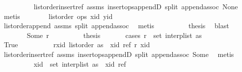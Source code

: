 \begin{isabellebody}
\ \ \ \ \ \ \ \ \isamarkupfalse%
\ list{\isacharunderscore}order{\isacharunderscore}insert{\isacharunderscore}ref\ assms{\isacharparenleft}{}{\isacharparenright}\ insert{\isacharunderscore}ops{\isacharunderscore}appendD\ split\ append{\isachardot}assoc\ None\ \isamarkupfalse%
\ metis\isanewline
\ \ \ \ \ \ \isamarkupfalse%
\ {\isachardoublequoteopen}list{\isacharunderscore}order\ ops\ xid\ yid{\isachardoublequoteclose}\isanewline
\ \ \ \ \ \ \ \ \isamarkupfalse%
\ list{\isacharunderscore}order{\isacharunderscore}append\ assms{\isacharparenleft}{}{\isacharparenright}\ split\ append{\isachardot}assoc\ \isamarkupfalse%
\ metis\isanewline
\ \ \ \ \ \ \isamarkupfalse%
\ \isamarkupfalse%
\ {\isacharquery}thesis\ \isamarkupfalse%
\ blast\isanewline
\ \ \ \ \isamarkupfalse%
\isanewline
\ \ \ \ \ \ \isamarkupfalse%
\ {\isacharparenleft}Some\ r{\isacharparenright}\isanewline
\ \ \ \ \ \ \isamarkupfalse%
\ \isamarkupfalse%
\ {\isacharquery}thesis\isanewline
\ \ \ \ \ \ \isamarkupfalse%
{\isacharparenleft}cases\ {\isachardoublequoteopen}r\ {\isasymin}\ set\ {\isacharparenleft}interp{\isacharunderscore}list\ as{\isacharparenright}{\isachardoublequoteclose}{\isacharparenright}\isanewline
\ \ \ \ \ \ \ \ \isamarkupfalse%
\ True\isanewline
\ \ \ \ \ \ \ \ \isamarkupfalse%
\ r{\isacharunderscore}xid{\isacharcolon}\ {\isachardoublequoteopen}list{\isacharunderscore}order\ {\isacharparenleft}as\ {\isacharat}\ {\isacharbrackleft}{\isacharparenleft}xid{\isacharcomma}\ ref{\isacharparenright}{\isacharbrackright}{\isacharparenright}\ r\ xid{\isachardoublequoteclose}\isanewline
\ \ \ \ \ \ \ \ \ \ \isamarkupfalse%
\ list{\isacharunderscore}order{\isacharunderscore}insert{\isacharunderscore}ref\ assms{\isacharparenleft}{}{\isacharparenright}\ insert{\isacharunderscore}ops{\isacharunderscore}appendD\ split\ append{\isachardot}assoc\ Some\ \isamarkupfalse%
\ metis\isanewline
\ \ \ \ \ \ \ \ \isamarkupfalse%
\ {\isachardoublequoteopen}xid\ {\isasymin}\ set\ {\isacharparenleft}interp{\isacharunderscore}list\ {\isacharparenleft}as\ {\isacharat}\ {\isacharbrackleft}{\isacharparenleft}xid{\isacharcomma}\ ref{\isacharparenright}{\isacharbrackright}{\isacharparenright}{\isacharparenright}{\isachardoublequoteclose}\isanewline
\ \ \ \ \ \ \ \ \ \ \isamarkupfalse%

\end{isabellebody}
